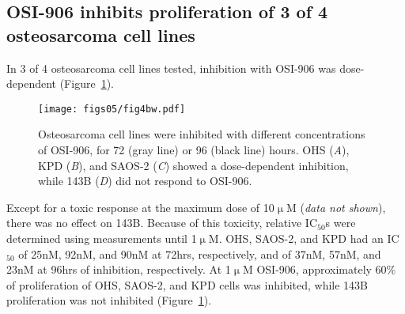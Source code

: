 \subsection{OSI-906 inhibits proliferation of 3 of 4 osteosarcoma cell lines}
In 3 of 4 osteosarcoma cell lines tested, inhibition with OSI-906 was dose\hyp{}dependent (Figure~\ref{fig5.4}).
%
\begin{figure}[htbp]
	\centering
	\texttt{[image: figs05/fig4bw.pdf]}	%
	\caption{Osteosarcoma cell lines were inhibited with different concentrations of OSI-906, for 72 (gray line) or 96 (black line) hours. OHS ({\it A}), KPD ({\it B}), and SAOS-2 ({\it C}) showed a dose\hyp{}dependent inhibition, while 143B ({\it D}) did not respond to OSI-906.}
	\label{fig5.4}
\end{figure}
%
Except for a toxic response at the maximum dose of 10$\upmu$M ({\it data not shown}), there was no effect on 143B. Because of this toxicity, relative IC$_{50}$s were determined using measurements until 1$\upmu$M. OHS, SAOS-2, and KPD had an IC$_{50}$ of 25nM, 92nM, and 90nM at 72hrs, respectively, and of 37nM, 57nM, and 23nM at 96hrs of inhibition, respectively. At 1$\upmu$M OSI-906, approximately 60\% of proliferation of OHS, SAOS-2, and KPD cells was inhibited, while 143B proliferation was not inhibited (Figure~\ref{fig5.4}).

